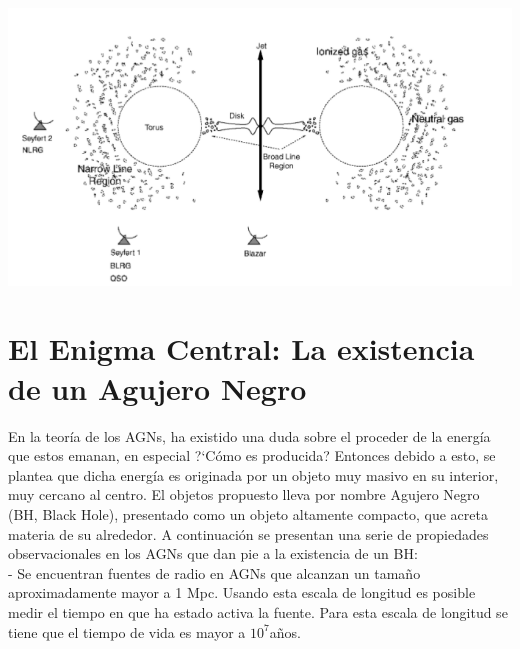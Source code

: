\begin{center}
\includegraphics[scale=.5]{./figures/3_AGNs/Clasificacion_AGN}
\label{fig:Tipos_AGNs_por_observador}
\end{center}


\section{El Enigma Central: La existencia de un Agujero Negro}
\label{sec: Enigma_centarl}

En la teoría de los AGNs, ha existido una duda sobre el proceder de la energía que estos emanan, en especial ?`Cómo es producida? Entonces debido a esto, se plantea que dicha energía es originada por un objeto muy masivo en su interior, muy cercano al centro. El objetos propuesto lleva por nombre  Agujero Negro (BH, Black Hole), presentado como un objeto altamente compacto, que acreta materia de su alrededor. A continuación se presentan una serie de propiedades observacionales en los AGNs que dan pie a la existencia de un BH: \\

- Se encuentran fuentes de radio en AGNs que alcanzan un tamaño aproximadamente mayor a 1 Mpc. Usando esta escala de longitud es posible medir el tiempo en que ha estado activa la fuente. Para esta escala de longitud se tiene que el tiempo de vida es mayor a $10^{7}$años.

